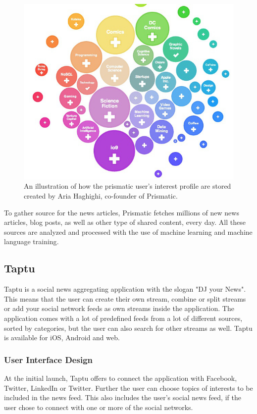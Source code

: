 \begin{figure}[!htbp]
\centering
\includegraphics[width=130mm]{GFX/tech/prismaticInterestsBubbles.jpg}
\caption{An illustration of how the prismatic user's interest profile are stored created by Aria Haghighi, co-founder of Prismatic.}
\label{prismatic_interest_bubbles}
\end{figure}

To gather source for the news articles, Prismatic fetches millions of new news articles, blog posts, as well as other type of shared content, every day. All these sources are analyzed and processed with the use of machine learning and machine language training\cite{prismatic_how_it_works}.

\subsection{Taptu}
Taptu is a social news aggregating application with the slogan "DJ your News". This means that the user can create their own stream, combine or split streams or add your social network feeds as own streams inside the application. The application comes with a lot of predefined feeds from a lot of different sources, sorted by categories, but the user can also search for other streams as well. Taptu is available for iOS, Android and web.

\subsubsection{User Interface Design}
At the initial launch, Taptu offers to connect the application with Facebook, Twitter, LinkedIn or Twitter. Further the user can choose topics of interests to be included in the news feed. This also includes the user's social news feed, if the user chose to connect with one or more of the social networks.

